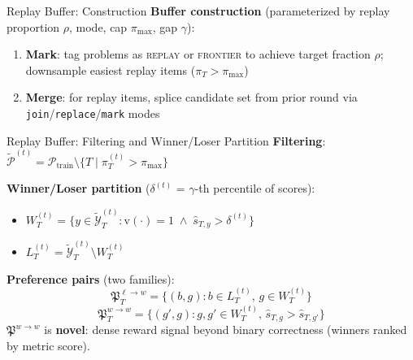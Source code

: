 \documentclass{beamer}
\begin{document}
\begin{frame}{Replay Buffer: Construction}
\vspace{0.5em}
\textbf{Buffer construction} (parameterized by replay proportion $\rho$, mode, cap $\pi_{\max}$, gap $\gamma$):
\vspace{0.4em}
\begin{enumerate}\setlength{\itemsep}{12pt}
  \item \textbf{Mark}: tag problems as \textsc{replay} or \textsc{frontier} to achieve target fraction $\rho$; downsample easiest replay items ($\pi_T > \pi_{\max}$)
  \item \textbf{Merge}: for replay items, splice candidate set from prior round via \texttt{join}/\texttt{replace}/\texttt{mark} modes
\end{enumerate}
\end{frame}

\begin{frame}{Replay Buffer: Filtering and Winner/Loser Partition}
\vspace{0.2em}
\textbf{Filtering}: $\widetilde{\mathcal{P}}^{(t)} = \mathcal{P}_{\mathrm{train}} \setminus \{T \mid \pi_T^{(t)} > \pi_{\max}\}$
\vspace{0.2em}

\textbf{Winner/Loser partition} ($\delta^{(t)}$ = $\gamma$-th percentile of scores):
\begin{itemize}\setlength{\itemsep}{3pt}
  \item $W_T^{(t)} = \{y \in \widetilde{\mathcal{Y}}^{(t)}_T : \mathrm{v}(\cdot) = 1 \;\wedge\; \widehat{s}_{T,y} > \delta^{(t)}\}$
  \item $L_T^{(t)} = \widetilde{\mathcal{Y}}^{(t)}_T \setminus W_T^{(t)}$
\end{itemize}
\vspace{0.2em}
\textbf{Preference pairs} (two families):
\[
  \mathfrak{P}^{\ell\to w}_T = \{(b,g) : b \in L_T^{(t)},\, g \in W_T^{(t)}\}
\]
\[
  \mathfrak{P}^{w\to w}_T = \{(g',g) : g,g' \in W_T^{(t)},\, \widehat{s}_{T,g} > \widehat{s}_{T,g'}\}
\]
\small $\mathfrak{P}^{w\to w}$ is \textbf{novel}: dense reward signal beyond binary correctness (winners ranked by metric score).
\end{frame}
\end{document}
